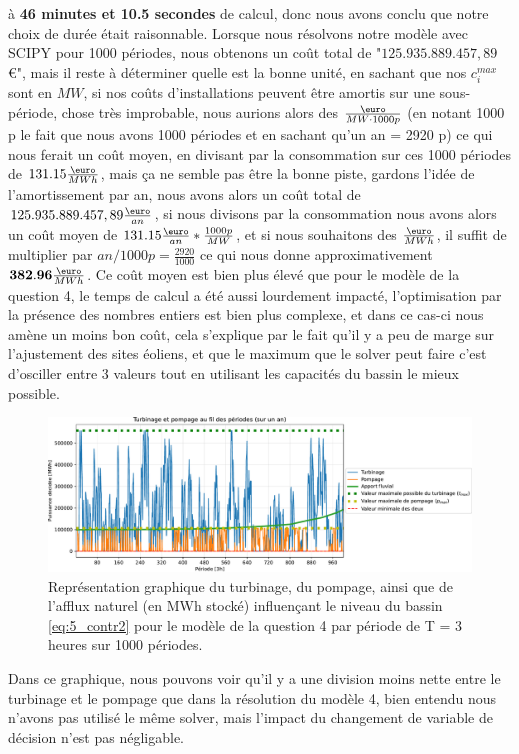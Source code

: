 \documentclass{article}
\begin{document}
à \textbf{46 minutes et 10.5 secondes} de calcul, donc nous avons conclu que notre choix de durée était raisonnable.
Lorsque nous résolvons notre modèle avec SCIPY pour 1000 périodes, nous obtenons un coût total de "$125.935.889.457,89$ \euro", mais il reste
à déterminer quelle est la bonne unité, en sachant que nos $c_i^{max}$ sont en $MW$, si nos coûts d'installations peuvent être amortis sur une sous-période, chose très improbable, nous aurions
alors des $\frac{\text{\euro}}{MW \cdot 1000 p}$ (en notant 1000 p le fait que nous avons 1000 périodes et en sachant 
qu'un an = 2920 p)
ce qui nous ferait un coût moyen, en divisant par la consommation sur ces 1000 périodes 
de $131.15 \frac{\text{\euro}}{MWh}$, mais ça ne semble pas être la bonne piste, gardons l'idée de l'amortissement par an, 
nous avons alors un coût total de $125.935.889.457,89 \frac{\text{\euro}}{an}$, si nous divisons par la consommation 
nous avons alors un coût moyen de $131.15 \frac{\text{\euro}}{an}*\frac{1000 p}{ MW}$, 
et si nous souhaitons des $\frac{\text{\euro}}{MWh}$, il suffit 
de multiplier par $an/ 1000 p  = \frac{2920}{1000}$ ce qui nous donne approximativement $\mathbf{382.96} \frac{\text{\euro}}{MWh}$.
Ce coût moyen est bien plus élevé que pour le modèle de la question 4, le temps de calcul a été aussi lourdement impacté, l'optimisation
par la présence des nombres entiers est bien plus complexe, et dans ce cas-ci nous amène un moins bon coût, cela s'explique par le fait qu'il
y a peu de marge sur l'ajustement des sites éoliens, et que le maximum que le solver peut faire c'est d'osciller entre 3 valeurs tout en utilisant
les capacités du bassin le mieux possible.

\begin{figure}[h!]
    \centering
    \includegraphics[scale=0.6]{GraphesP2/Turbinage_pompage_Q5.pdf}
    \caption{Représentation graphique du turbinage, du pompage, ainsi que de l'afflux naturel (en MWh stocké)
    influençant le niveau du bassin \eqref{eq:5_contr2} pour le modèle de la question 4 par période de T = 3 heures sur 1000 périodes.}
    \label{fig:Turbinage_pompage_Q5}
\end{figure}
Dans ce graphique, nous pouvons voir qu'il y a une division moins nette entre le turbinage et le pompage que dans la résolution du modèle 4, bien entendu
nous n'avons pas utilisé le même solver, mais l'impact du changement de variable de décision n'est pas négligable.
\end{document}
